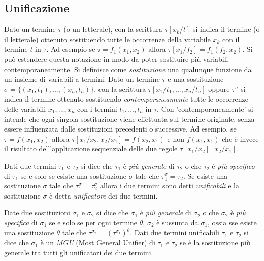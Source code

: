 \documentclass[./main.tex]{subfiles}
\begin{document}
\subsection{Unificazione}
Dato un termine $\tau$ (o un letterale), con la scrittura $\tau[x_k/t]$ si indica il termine (o il letterale) ottenuto sostituendo
tutte le occorrenze della variabile $x_k$ con il termine $t$ in $\tau$. Ad esempio se $\tau = f_1(x_1, x_2)$ allora $\tau[x_1/f_2] = f_1(f_2, x_2)$.
Si può estendere questa notazione in modo da poter sostituire più variabili contemporaneamente. 
Si definisce come \textit{sostituzione} una qualunque funzione da un insieme di variabili a termini.
Dato un termine $\tau$ e una sostituzione $\sigma = \{(x_1, t_1), ..., (x_n, t_n)\}$,
con la scrittura $\tau[x_1/t_1, ..., x_n/t_n]$ oppure $\tau^\sigma$ si indica il termine ottenuto sostituendo \textit{contemporaneamente} 
tutte le occorrenze delle variabili $x_1, ..., x_n$ con i termini $t_1, ..., t_n$ in $\tau$.
Con 'contemporaneamente' si intende che ogni singola sostituzione viene effettuata sul termine originale, 
senza essere influenzata dalle sostituzioni precedenti o successive.
Ad esempio, se $\tau = f(x_1, x_2)$ allora $\tau[x_1/x_2, x_2/x_1] = f(x_2, x_1)$ e non $f(x_1, x_1)$ 
che è invece il risultato dell'applicazione sequenziale delle due regole $\tau[x_1/x_2][x_2/x_1]$.

Dati due termini $\tau_1$ e $\tau_2$ si dice che $\tau_1$ è \textit{più generale} di $\tau_2$ o che $\tau_2$ è \textit{più specifico} di $\tau_1$
se e solo se esiste una sostituzione $\sigma$ tale che $\tau_1^\sigma = \tau_2$.
Se esiste una sostituzione $\sigma$ tale che $\tau_1^\sigma = \tau_2^\sigma$ allora i due termini sono detti \textit{unificabili} e 
la sostituzione $\sigma$ è detta \textit{unificatore} dei due termini.


Date due sostituzioni $\sigma_1$ e $\sigma_2$ si dice che $\sigma_1$ 
è \textit{più generale} di $\sigma_2$ o che $\sigma_2$ è \textit{più specifica} di $\sigma_1$ se e solo se 
per ogni termine $\theta$, $\sigma_2$ è sussunta da $\sigma_1$, 
ossia sse esiste una sostituzione $\theta$ tale che $\tau^{\sigma_2} = {(\tau^{\sigma_1})}^\theta$.
Dati due termini unificabili $\tau_1$ e $\tau_2$ si dice che $\sigma_1$ è un \textit{MGU} (Most General Unifier) di $\tau_1$ e $\tau_2$ 
se è la sostituzione più generale tra tutti gli unificatori dei due termini.
\end{document}
